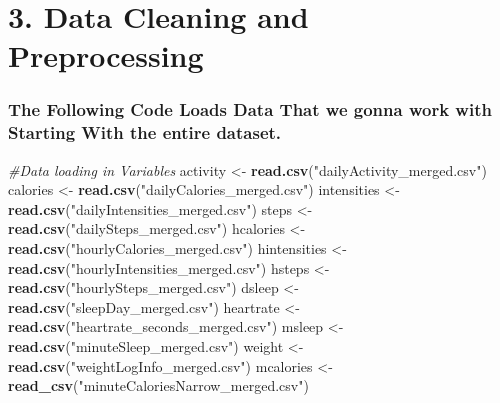 \documentclass[
]{article}
\newenvironment{Shaded}{\begin{snugshade}}{\end{snugshade}}
\newcommand{\CommentTok}[1]{\textcolor[rgb]{0.56,0.35,0.01}{\textit{#1}}}
\newcommand{\FunctionTok}[1]{\textcolor[rgb]{0.13,0.29,0.53}{\textbf{#1}}}
\newcommand{\NormalTok}[1]{#1}
\newcommand{\OtherTok}[1]{\textcolor[rgb]{0.56,0.35,0.01}{#1}}
\newcommand{\StringTok}[1]{\textcolor[rgb]{0.31,0.60,0.02}{#1}}
\begin{document}
\section{3. Data Cleaning and
Preprocessing}\label{data-cleaning-and-preprocessing}

\subsubsection{The Following Code Loads Data That we gonna work with
Starting With the entire
dataset.}\label{the-following-code-loads-data-that-we-gonna-work-with-starting-with-the-entire-dataset.}

\begin{Shaded}
\begin{Highlighting}[]
\CommentTok{\#Data loading in Variables}
\NormalTok{activity }\OtherTok{\textless{}{-}} \FunctionTok{read.csv}\NormalTok{(}\StringTok{"dailyActivity\_merged.csv"}\NormalTok{)}
\NormalTok{calories }\OtherTok{\textless{}{-}} \FunctionTok{read.csv}\NormalTok{(}\StringTok{"dailyCalories\_merged.csv"}\NormalTok{)}
\NormalTok{intensities }\OtherTok{\textless{}{-}} \FunctionTok{read.csv}\NormalTok{(}\StringTok{"dailyIntensities\_merged.csv"}\NormalTok{)}
\NormalTok{steps }\OtherTok{\textless{}{-}} \FunctionTok{read.csv}\NormalTok{(}\StringTok{"dailySteps\_merged.csv"}\NormalTok{)}
\NormalTok{hcalories }\OtherTok{\textless{}{-}} \FunctionTok{read.csv}\NormalTok{(}\StringTok{"hourlyCalories\_merged.csv"}\NormalTok{)}
\NormalTok{hintensities }\OtherTok{\textless{}{-}} \FunctionTok{read.csv}\NormalTok{(}\StringTok{"hourlyIntensities\_merged.csv"}\NormalTok{)}
\NormalTok{hsteps }\OtherTok{\textless{}{-}} \FunctionTok{read.csv}\NormalTok{(}\StringTok{"hourlySteps\_merged.csv"}\NormalTok{)}
\NormalTok{dsleep }\OtherTok{\textless{}{-}} \FunctionTok{read.csv}\NormalTok{(}\StringTok{"sleepDay\_merged.csv"}\NormalTok{)}
\NormalTok{heartrate }\OtherTok{\textless{}{-}} \FunctionTok{read.csv}\NormalTok{(}\StringTok{"heartrate\_seconds\_merged.csv"}\NormalTok{)}
\NormalTok{msleep }\OtherTok{\textless{}{-}} \FunctionTok{read.csv}\NormalTok{(}\StringTok{"minuteSleep\_merged.csv"}\NormalTok{)}
\NormalTok{weight }\OtherTok{\textless{}{-}} \FunctionTok{read.csv}\NormalTok{(}\StringTok{"weightLogInfo\_merged.csv"}\NormalTok{)}
\NormalTok{mcalories }\OtherTok{\textless{}{-}} \FunctionTok{read\_csv}\NormalTok{(}\StringTok{"minuteCaloriesNarrow\_merged.csv"}\NormalTok{)}
\end{Highlighting}
\end{Shaded}
\end{document}
